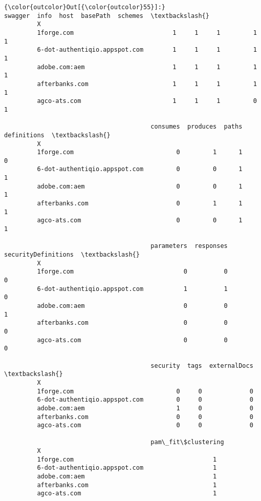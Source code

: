 \documentclass[11pt]{article}
\begin{document}
\begin{Verbatim}[commandchars=\\\{\}]
{\color{outcolor}Out[{\color{outcolor}55}]:}                                swagger  info  host  basePath  schemes  \textbackslash{}
         X                                                                       
         1forge.com                           1     1     1         1        1   
         6-dot-authentiqio.appspot.com        1     1     1         1        1   
         adobe.com:aem                        1     1     1         1        1   
         afterbanks.com                       1     1     1         1        1   
         agco-ats.com                         1     1     1         0        1   
         
                                        consumes  produces  paths  definitions  \textbackslash{}
         X                                                                       
         1forge.com                            0         1      1            0   
         6-dot-authentiqio.appspot.com         0         0      1            1   
         adobe.com:aem                         0         0      1            1   
         afterbanks.com                        0         1      1            1   
         agco-ats.com                          0         0      1            1   
         
                                        parameters  responses  securityDefinitions  \textbackslash{}
         X                                                                           
         1forge.com                              0          0                    0   
         6-dot-authentiqio.appspot.com           1          1                    0   
         adobe.com:aem                           0          0                    1   
         afterbanks.com                          0          0                    0   
         agco-ats.com                            0          0                    0   
         
                                        security  tags  externalDocs  \textbackslash{}
         X                                                             
         1forge.com                            0     0             0   
         6-dot-authentiqio.appspot.com         0     0             0   
         adobe.com:aem                         1     0             0   
         afterbanks.com                        0     0             0   
         agco-ats.com                          0     0             0   
         
                                        pam\_fit\$clustering  
         X                                                  
         1forge.com                                      1  
         6-dot-authentiqio.appspot.com                   1  
         adobe.com:aem                                   1  
         afterbanks.com                                  1  
         agco-ats.com                                    1  
\end{Verbatim}
            
\end{document}
